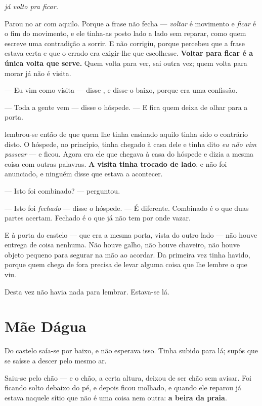 \documentclass[livro.tex]{subfiles}
\begin{document}
\begin{center}
\emph{já volto pra ficar.}
\end{center}

\noindent Parou no ar com aquilo. Porque a frase não fecha --- \emph{voltar} é
movimento e \emph{ficar} é o fim do movimento, e ele tinha-as posto lado a lado
sem reparar, como quem escreve uma contradição a sorrir. E não corrigiu, porque
percebeu que a frase estava certa e que o errado era exigir-lhe que escolhesse.
\textbf{Voltar para ficar é a única volta que serve.} Quem volta para ver, sai
outra vez; quem volta para morar já não é visita.

\medskip
\noindent --- Eu vim como visita --- disse \Ben , e disse-o baixo, porque era
uma confissão.

--- Toda a gente vem --- disse o hóspede. --- E fica quem deixa de olhar para
a porta.

\medskip
\noindent \Ben lembrou-se então de que quem lhe tinha ensinado aquilo tinha
sido o contrário disto. O hóspede, no princípio, tinha chegado à casa dele e
tinha dito \emph{eu não vim passear} --- e ficou. Agora era ele que chegava à
casa do hóspede e dizia a mesma coisa com outras palavras. \textbf{A visita
tinha trocado de lado}, e não foi anunciado, e ninguém disse que estava a
acontecer.

\medskip
\noindent --- Isto foi combinado? --- perguntou.

--- Isto foi \emph{fechado} --- disse o hóspede. --- É diferente. Combinado é o
que duas partes acertam. Fechado é o que já não tem por onde vazar.

\medskip
\noindent E à porta do castelo --- que era a mesma porta, vista do outro lado
--- não houve entrega de coisa nenhuma. Não houve galho, não houve chaveiro,
não houve objeto pequeno para segurar na mão ao acordar. Da primeira vez tinha
havido, porque quem chega de fora precisa de levar alguma coisa que lhe lembre
o que viu.

\medskip
\noindent Desta vez não havia nada para lembrar. Estava-se lá.

\chapter{Mãe Dágua}

Do castelo saía-se por baixo, e \Ben não esperava isso. Tinha subido para
lá; supôs que se saísse a descer pelo mesmo ar.

Saiu-se pelo chão --- e o chão, a certa altura, deixou de ser chão sem avisar.
Foi ficando solto debaixo do pé, e depois ficou molhado, e quando ele reparou já
estava naquele sítio que não é uma coisa nem outra: \textbf{a beira da praia}.
\end{document}
